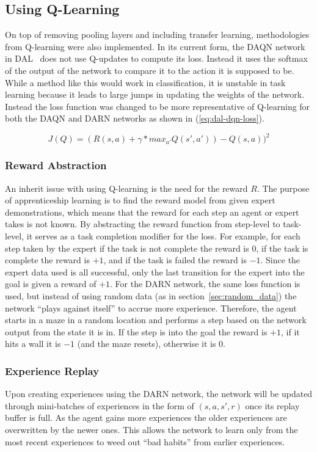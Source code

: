 \documentclass[12pt,american]{report}
\begin{document}
\subsection{Using Q-Learning}
On top of removing pooling layers and including transfer learning, methodologies from Q-learning were also implemented.  In its current form, the DAQN network in DAL~\cite{markovikj2014deep} does not use Q-updates to compute its loss.  Instead it uses the softmax of the output of the network to compare it to the action it is supposed to be.  While a method like this would work in classification, it is unstable in task learning because it leads to large jumps in updating the weights of the network.  Instead the loss function was changed to be more representative of Q-learning for both the DAQN and DARN networks as shown in (\ref{eq:dal-dqn-loss}).

\begin{equation}
     \label{eq:dal-dqn-loss}
     J(Q) =(R(s,a)+\gamma*max_{a'}Q(s',a'))-Q(s,a))^2
\end{equation}
\subsubsection{Reward Abstraction}
An inherit issue with using Q-learning is the need for the reward $R$.  The purpose of apprenticeship learning is to find the reward model from given expert demonstrations, which means that the reward for each step an agent or expert takes is not known. By abstracting the reward function from step-level to task-level, it serves as a task completion modifier for the loss.  For example, for each step taken by the expert if the task is not complete the reward is $0$, if the task is complete the reward is $+1$, and if the task is failed the reward is $-1$.  Since the expert data used is all successful, only the last transition for the expert into the goal is given a reward of $+1$.  For the DARN network, the same loss function is used, but instead of using random data (as in section~\ref{sec:random_data}) the network ``plays against itself'' to accrue more experience.  Therefore, the agent starts in a maze in a random location and performs a step based on the network output from the state it is in.  If the step is into the goal the reward is $+1$, if it hits a wall it is $-1$ (and the maze resets), otherwise it is $0$.  

\subsubsection{Experience Replay}
Upon creating experiences using the DARN network, the network will be updated through mini-batches of experiences in the form of $(s,a,s',r)$ once its replay buffer is full.  As the agent gains more experiences the older experiences are overwritten by the newer ones.  This allows the network to learn only from the most recent experiences to weed out ``bad habits'' from earlier experiences. 
\end{document}
